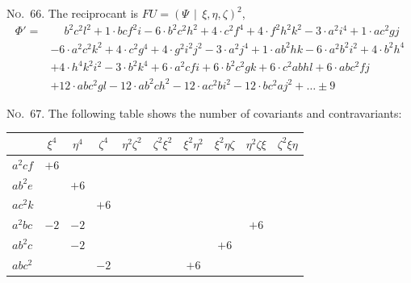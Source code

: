 \documentclass[11pt,a4paper]{article}
\begin{document}
\noindent\textsc{No.~66.} The reciprocant is $FU = (\Psi\, \mid\, \xi, \eta, \zeta)^2$,
\begin{align*}
\Phi' = &\phantom{+} b^2c^2l^2 + 1\cdot bcf^2i - 6\cdot b^2c^2h^2 + 4\cdot c^2f^4 + 4\cdot f^2h^2k^2 - 3\cdot a^2i^4 + 1\cdot ac^2gj\\
& - 6\cdot a^2c^2k^2 + 4\cdot c^2g^4 + 4\cdot g^2i^2j^2 - 3\cdot a^2j^4 + 1\cdot ab^2hk - 6\cdot a^2b^2i^2 + 4\cdot b^2h^4\\
& + 4\cdot h^4k^2i^2 - 3\cdot b^2k^4 + 6\cdot a^2cfi + 6\cdot b^2c^2gk + 6\cdot c^2abhl + 6\cdot abc^2fj\\
& + 12\cdot abc^2gl - 12\cdot ab^2ch^2 - 12\cdot ac^2bi^2 - 12\cdot bc^2aj^2 + \ldots \pm 9
\end{align*}

\clearpage
\noindent\textsc{No.~67.} The following table shows the number of covariants and contravariants:
\begin{center}
\begin{tabular}{lccccccccc}
\toprule
& $\xi^4$ & $\eta^4$ & $\zeta^4$ & $\eta^2\zeta^2$ & $\zeta^2\xi^2$ & $\xi^2\eta^2$ & $\xi^2\eta\zeta$ & $\eta^2\zeta\xi$ & $\zeta^2\xi\eta$ \\
\midrule
$a^2cf$ & $+6$ & & & & & & & & \\
$ab^2e$ & & $+6$ & & & & & & & \\
$ac^2k$ & & & $+6$ & & & & & & \\
$a^2bc$ & $-2$ & $-2$ & & & & & & $+6$ & \\
$ab^2c$ & & $-2$ & & & & & $+6$ & & \\
$abc^2$ & & & $-2$ & & & $+6$ & & & \\
\bottomrule
\end{tabular}
\end{center}
\end{document}
